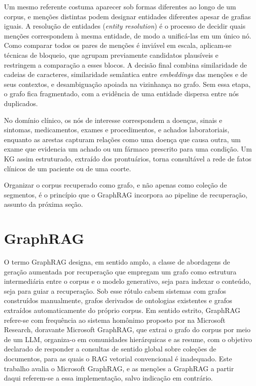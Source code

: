 Um mesmo referente costuma aparecer sob formas diferentes ao longo de um corpus, e menções distintas podem designar entidades diferentes apesar de grafias iguais. A resolução de entidades (\textit{entity resolution}) é o processo de decidir quais menções correspondem à mesma entidade, de modo a unificá-las em um único nó. Como comparar todos os pares de menções é inviável em escala, aplicam-se técnicas de bloqueio, que agrupam previamente candidatos plausíveis e restringem a comparação a esses blocos. A decisão final combina similaridade de cadeias de caracteres, similaridade semântica entre \textit{embeddings} das menções e de seus contextos, e desambiguação apoiada na vizinhança no grafo. Sem essa etapa, o grafo fica fragmentado, com a evidência de uma entidade dispersa entre nós duplicados.

No domínio clínico, os nós de interesse correspondem a doenças, sinais e sintomas, medicamentos, exames e procedimentos, e achados laboratoriais, enquanto as arestas capturam relações como uma doença que causa outra, um exame que evidencia um achado ou um fármaco prescrito para uma condição. Um KG assim estruturado, extraído dos prontuários, torna consultável a rede de fatos clínicos de um paciente ou de uma coorte.

Organizar o corpus recuperado como grafo, e não apenas como coleção de segmentos, é o princípio que o GraphRAG incorpora ao pipeline de recuperação, assunto da próxima seção.

\section{GraphRAG}\label{sec:graphrag}

O termo GraphRAG designa, em sentido amplo, a classe de abordagens de geração aumentada por recuperação que empregam um grafo como estrutura intermediária entre o corpus e o modelo generativo, seja para indexar o conteúdo, seja para guiar a recuperação. Sob esse rótulo cabem sistemas com grafos construídos manualmente, grafos derivados de ontologias existentes e grafos extraídos automaticamente do próprio corpus. Em sentido estrito, GraphRAG refere-se com frequência ao sistema homônimo proposto por \citet{edge2024} na Microsoft Research, doravante Microsoft GraphRAG, que extrai o grafo do corpus por meio de um LLM, organiza-o em comunidades hierárquicas e as resume, com o objetivo declarado de responder a consultas de sentido global sobre coleções de documentos, para as quais o RAG vetorial convencional é inadequado. Este trabalho avalia o Microsoft GraphRAG, e as menções a GraphRAG a partir daqui referem-se a essa implementação, salvo indicação em contrário.

